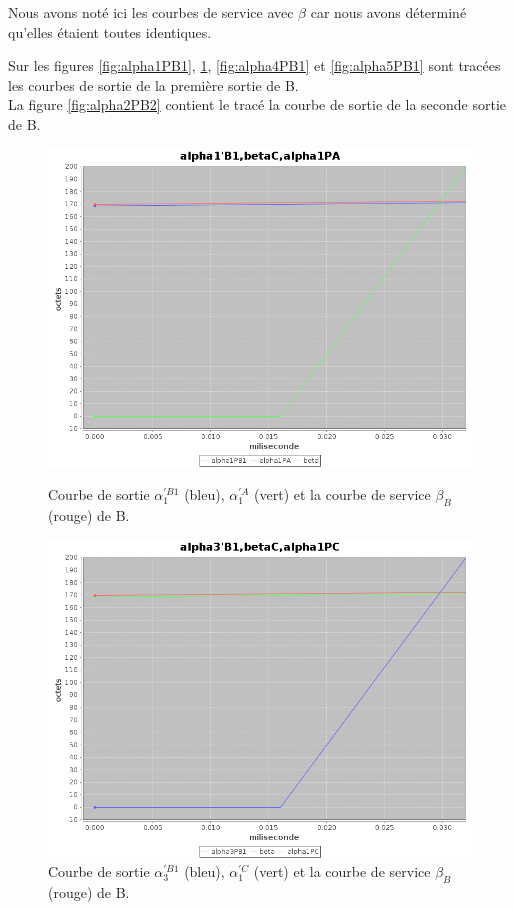 Nous avons noté ici les courbes de service avec $\beta$ car nous avons déterminé qu'elles étaient toutes identiques.

Sur les figures \ref{fig:alpha1PB1}, \ref{fig:alpha3PB1}, \ref{fig:alpha4PB1} et \ref{fig:alpha5PB1} sont tracées les courbes de sortie de la première sortie de B. \\

La figure \ref{fig:alpha2PB2} contient le tracé la courbe de sortie de la seconde sortie de B.

\begin{figure}[!ht]%
\begin{minipage}{.48\textwidth}%
\centering%
\noindent\includegraphics[width = \textwidth]{./II/images/alpha1PB1.png}%
\caption{\label{fig:alpha1PB1}Courbe de sortie $\alpha_{1}^{'B1}$ (bleu), $\alpha_{1} ^{'A}$ (vert) et la courbe de service $\beta_B$ (rouge) de B.}%
\end{minipage}\hfill%
\begin{minipage}{.48\textwidth}%
\centering%
\noindent\includegraphics[width = \textwidth]{./II/images/alpha3PB1.png}%
\caption{\label{fig:alpha3PB1}Courbe de sortie $\alpha_3 ^{'B1}$ (bleu), $\alpha_1^{'C}$ (vert) et la courbe de service $\beta_B$ (rouge) de B.}%
\end{minipage}\vspace{5mm}\newline 
\end{figure}
